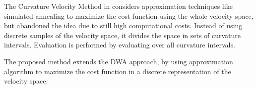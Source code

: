 The Curvature Velocity Method in \cite{simmons1996curvature} considers approximation techniques like simulated annealing to maximize the cost function using the whole velocity space, but abandoned the idea due to still high computational costs. 
Instead of using discrete samples of the velocity space, it divides the space in sets of curvature intervals. 
Evaluation is performed by evaluating over all curvature intervals.

The proposed method extends the DWA approach, by using approximation algorithm to maximize the cost function in a discrete representation of the velocity space.






